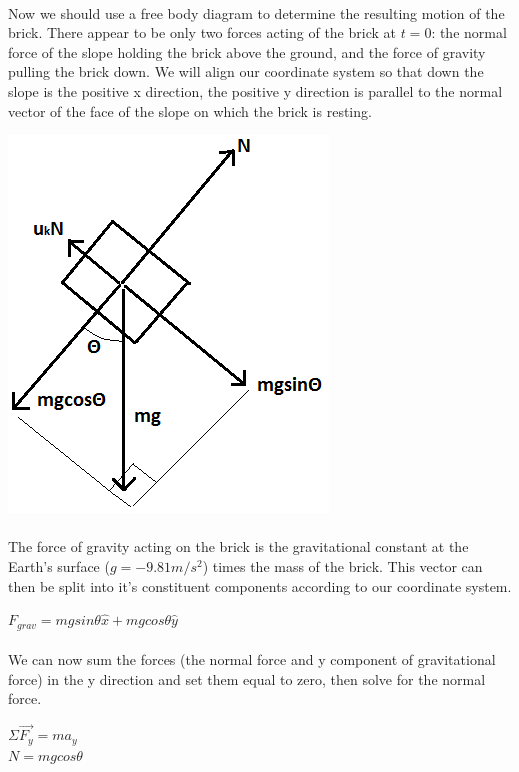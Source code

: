 \documentclass[11pt,a4paper]{report}
\begin{document}
\paragraph{}Now we should use a free body diagram to determine the resulting motion of the brick. There appear to be only two forces acting of the brick at $t = 0$: the normal force of the slope holding the brick above the ground, and the force of gravity pulling the brick down. We will align our coordinate system so that down the slope is the positive x direction, the positive y direction is parallel to the normal vector of the face of the slope on which the brick is resting. 
\begin{center}
\includegraphics[scale=0.5]{FBD}
\end{center}
\paragraph{}The force of gravity acting on the brick is the gravitational constant at the Earth's surface ($g = -9.81m/s^2$) times the mass of the brick. This vector can then be split into it's constituent components according to our coordinate system.
\begin{center}
$F_{grav} = mgsin\theta\hat{x} + mgcos\theta\hat{y}$
\end{center}
\paragraph{}We can now sum the forces (the normal force and y component of gravitational force) in the y direction and set them equal to zero, then solve for the normal force.
\begin{center}
$\Sigma{\vec{F_y}} = ma_y$ \\
$N = mgcos\theta$
\end{center}
\end{document}
